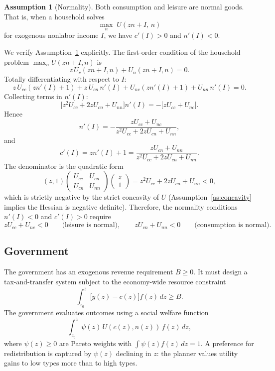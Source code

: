 \documentclass[12pt,a4paper]{article}
\theoremstyle{definition}
\newtheorem{assumption}{Assumption}[section]
\theoremstyle{plain}
\theoremstyle{remark}
\newcommand{\zbar}{\bar{z}}
\newcommand{\zlow}{z_{\scriptscriptstyle 0}}
\begin{document}
\begin{assumption}[Normality]
\label{as:normal}
Both consumption and leisure are normal goods. That is, when a household solves
\[
  \max_n \; U(zn + I, \, n)
\]
for exogenous nonlabor income $I$, we have $c'(I) > 0$ and $n'(I) < 0$.
\end{assumption}

We verify Assumption~\ref{as:normal} explicitly. The first-order condition of the household problem $\max_n U(zn+I, n)$ is
\[
  z \, U_c(zn+I, n) + U_n(zn+I, n) = 0.
\]
Totally differentiating with respect to $I$:
\[
  z \, U_{cc}(z n'(I) + 1) + z \, U_{cn} \, n'(I) + U_{nc}(z n'(I) + 1) + U_{nn} \, n'(I) = 0.
\]
Collecting terms in $n'(I)$:
\[
  \bigl[ z^2 U_{cc} + 2z U_{cn} + U_{nn} \bigr] n'(I) = -\bigl[ z U_{cc} + U_{nc} \bigr].
\]
Hence
\begin{equation}
\label{eq:income_effect_n}
  n'(I) = -\frac{z U_{cc} + U_{nc}}{z^2 U_{cc} + 2z U_{cn} + U_{nn}},
\end{equation}
and
\begin{equation}
\label{eq:income_effect_c}
  c'(I) = z n'(I) + 1 = \frac{z U_{cn} + U_{nn}}{z^2 U_{cc} + 2z U_{cn} + U_{nn}}.
\end{equation}
The denominator is the quadratic form
\[
  (z, 1)
  \begin{pmatrix} U_{cc} & U_{cn} \\ U_{cn} & U_{nn} \end{pmatrix}
  \begin{pmatrix} z \\ 1 \end{pmatrix}
  = z^2 U_{cc} + 2z U_{cn} + U_{nn} < 0,
\]
which is strictly negative by the strict concavity of $U$ (Assumption~\ref{as:concavity} implies the Hessian is negative definite). Therefore, the normality conditions $n'(I) < 0$ and $c'(I) > 0$ require
\begin{equation}
\label{eq:normality_conditions}
  z U_{cc} + U_{nc} < 0 \qquad \text{(leisure is normal)}, \qquad
  z U_{cn} + U_{nn} < 0 \qquad \text{(consumption is normal)}.
\end{equation}

\subsection{Government}

The government has an exogenous revenue requirement $B \geq 0$. It must design a tax-and-transfer system subject to the economy-wide resource constraint
\begin{equation}
\label{eq:resource}
  \int_{\zlow}^{\zbar} \bigl[ y(z) - c(z) \bigr] f(z) \, dz \geq B.
\end{equation}
The government evaluates outcomes using a social welfare function
\[
  \int_{\zlow}^{\zbar} \psi(z) \, U(c(z), n(z)) \, f(z) \, dz,
\]
where $\psi(z) \geq 0$ are Pareto weights with $\int \psi(z) f(z) \, dz = 1$. A preference for redistribution is captured by $\psi(z)$ declining in $z$: the planner values utility gains to low types more than to high types.
\end{document}
